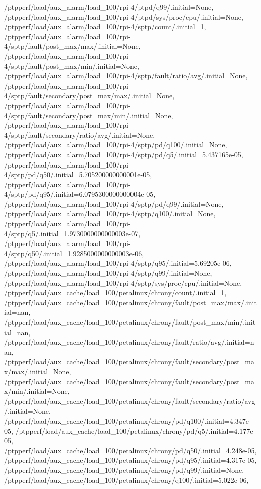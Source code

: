 {    /ptpperf/load/aux_alarm/load_100/rpi-4/ptpd/q99/.initial=None,
    /ptpperf/load/aux_alarm/load_100/rpi-4/ptpd/sys/proc/cpu/.initial=None,
    /ptpperf/load/aux_alarm/load_100/rpi-4/sptp/count/.initial=1,
    /ptpperf/load/aux_alarm/load_100/rpi-4/sptp/fault/post_max/max/.initial=None,
    /ptpperf/load/aux_alarm/load_100/rpi-4/sptp/fault/post_max/min/.initial=None,
    /ptpperf/load/aux_alarm/load_100/rpi-4/sptp/fault/ratio/avg/.initial=None,
    /ptpperf/load/aux_alarm/load_100/rpi-4/sptp/fault/secondary/post_max/max/.initial=None,
    /ptpperf/load/aux_alarm/load_100/rpi-4/sptp/fault/secondary/post_max/min/.initial=None,
    /ptpperf/load/aux_alarm/load_100/rpi-4/sptp/fault/secondary/ratio/avg/.initial=None,
    /ptpperf/load/aux_alarm/load_100/rpi-4/sptp/pd/q100/.initial=None,
    /ptpperf/load/aux_alarm/load_100/rpi-4/sptp/pd/q5/.initial=5.437165e-05,
    /ptpperf/load/aux_alarm/load_100/rpi-4/sptp/pd/q50/.initial=5.705200000000001e-05,
    /ptpperf/load/aux_alarm/load_100/rpi-4/sptp/pd/q95/.initial=6.0795300000000004e-05,
    /ptpperf/load/aux_alarm/load_100/rpi-4/sptp/pd/q99/.initial=None,
    /ptpperf/load/aux_alarm/load_100/rpi-4/sptp/q100/.initial=None,
    /ptpperf/load/aux_alarm/load_100/rpi-4/sptp/q5/.initial=1.9730000000000003e-07,
    /ptpperf/load/aux_alarm/load_100/rpi-4/sptp/q50/.initial=1.9285000000000003e-06,
    /ptpperf/load/aux_alarm/load_100/rpi-4/sptp/q95/.initial=5.69205e-06,
    /ptpperf/load/aux_alarm/load_100/rpi-4/sptp/q99/.initial=None,
    /ptpperf/load/aux_alarm/load_100/rpi-4/sptp/sys/proc/cpu/.initial=None,
    /ptpperf/load/aux_cache/load_100/petalinux/chrony/count/.initial=1,
    /ptpperf/load/aux_cache/load_100/petalinux/chrony/fault/post_max/max/.initial=nan,
    /ptpperf/load/aux_cache/load_100/petalinux/chrony/fault/post_max/min/.initial=nan,
    /ptpperf/load/aux_cache/load_100/petalinux/chrony/fault/ratio/avg/.initial=nan,
    /ptpperf/load/aux_cache/load_100/petalinux/chrony/fault/secondary/post_max/max/.initial=None,
    /ptpperf/load/aux_cache/load_100/petalinux/chrony/fault/secondary/post_max/min/.initial=None,
    /ptpperf/load/aux_cache/load_100/petalinux/chrony/fault/secondary/ratio/avg/.initial=None,
    /ptpperf/load/aux_cache/load_100/petalinux/chrony/pd/q100/.initial=4.347e-05,
    /ptpperf/load/aux_cache/load_100/petalinux/chrony/pd/q5/.initial=4.177e-05,
    /ptpperf/load/aux_cache/load_100/petalinux/chrony/pd/q50/.initial=4.248e-05,
    /ptpperf/load/aux_cache/load_100/petalinux/chrony/pd/q95/.initial=4.317e-05,
    /ptpperf/load/aux_cache/load_100/petalinux/chrony/pd/q99/.initial=None,
    /ptpperf/load/aux_cache/load_100/petalinux/chrony/q100/.initial=5.022e-06,
}
